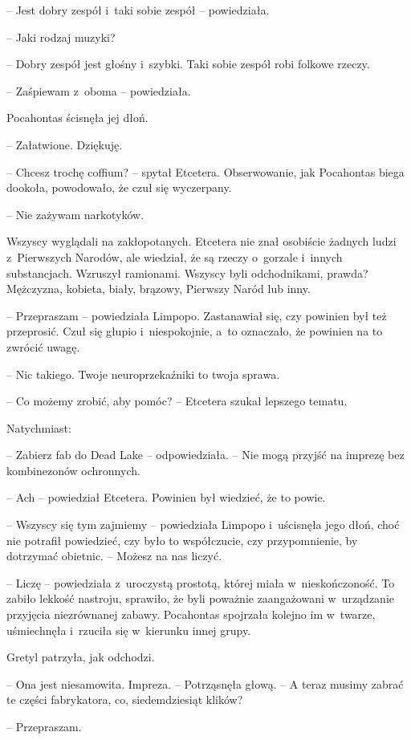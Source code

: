 \documentclass[oneside,polish,11pt,sfheadings]{mwbk}
\begin{document}
-- Jest dobry zespół i~taki sobie zespół -- powiedziała.

-- Jaki rodzaj muzyki?

-- Dobry zespół jest głośny i~szybki. Taki sobie zespół robi folkowe
rzeczy.

-- Zaśpiewam z~oboma -- powiedziała.

Pocahontas ścisnęła jej dłoń. 

-- Załatwione. Dziękuję.

-- Chcesz trochę coffium? -- spytał Etcetera. Obserwowanie, jak Pocahontas
biega dookoła, powodowało, że czuł się wyczerpany.

-- Nie zażywam narkotyków.

Wszyscy wyglądali na zakłopotanych. Etcetera nie znał osobiście żadnych
ludzi z~Pierwszych Narodów, ale wiedział, że są rzeczy o~gorzale i~innych substancjach. Wzruszył ramionami. Wszyscy byli odchodnikami,
prawda? Mężczyzna, kobieta, biały, brązowy, Pierwszy Naród lub inny.

-- Przepraszam -- powiedziała Limpopo. Zastanawiał się, czy powinien był
też przeprosić. Czuł się głupio i~niespokojnie, a~to oznaczało, że
powinien na to zwrócić uwagę.

-- Nic takiego. Twoje neuroprzekaźniki to twoja sprawa.

-- Co możemy zrobić, aby pomóc? -- Etcetera szukał lepszego tematu.

Natychmiast: 

-- Zabierz fab do Dead Lake -- odpowiedziała. -- Nie mogą
przyjść na imprezę bez kombinezonów ochronnych.

-- Ach -- powiedział Etcetera. Powinien był wiedzieć, że to powie.

-- Wszyscy się tym zajmiemy -- powiedziała Limpopo i~uścisnęła jego dłoń,
choć nie potrafił powiedzieć, czy było to współczucie, czy
przypomnienie, by dotrzymać obietnic. -- Możesz na nas liczyć.

-- Liczę -- powiedziała z~uroczystą prostotą, której miała w~nieskończoność. To zabiło lekkość nastroju, sprawiło, że byli poważnie
zaangażowani w~urządzanie przyjęcia niezrównanej zabawy. Pocahontas
spojrzała kolejno im w~twarze, uśmiechnęła i~rzuciła się w~kierunku
innej grupy.

Gretyl patrzyła, jak odchodzi. 

-- Ona jest niesamowita. Impreza. -- Potrząsnęła głową. -- A teraz musimy zabrać te części fabrykatora, co,
siedemdziesiąt klików?

-- Przepraszam.
\end{document}
